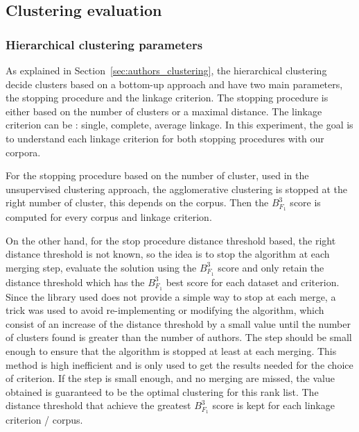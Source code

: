\subsection{Clustering evaluation}

\subsubsection{Hierarchical clustering parameters}

As explained in Section~\ref{sec:authors_clustering}, the hierarchical clustering decide clusters based on a bottom-up approach and have two main parameters, the stopping procedure and the linkage criterion.
The stopping procedure is either based on the number of clusters or a maximal distance.
The linkage criterion can be : single, complete, average linkage.
In this experiment, the goal is to understand each linkage criterion for both stopping procedures with our corpora.

For the stopping procedure based on the number of cluster, used in the unsupervised clustering approach, the agglomerative clustering is stopped at the right number of cluster, this depends on the corpus.
Then the $B^3_{F_1}$ score is computed for every corpus and linkage criterion.

On the other hand, for the stop procedure distance threshold based, the right distance threshold is not known, so the idea is to stop the algorithm at each merging step, evaluate the solution using the $B^3_{F_1}$ score and only retain the distance threshold which has the $B^3_{F_1}$ best score for each dataset and criterion.
Since the library used does not provide a simple way to stop at each merge, a trick was used to avoid re-implementing or modifying the algorithm, which consist of an increase of the distance threshold by a small value until the number of clusters found is greater than the number of authors.
The step should be small enough to ensure that the algorithm is stopped at least at each merging.
This method is high inefficient and is only used to get the results needed for the choice of criterion.
If the step is small enough, and no merging are missed, the value obtained is guaranteed to be the optimal clustering for this rank list.
The distance threshold that achieve the greatest $B^3_{F_1}$ score is kept for each linkage criterion / corpus.

